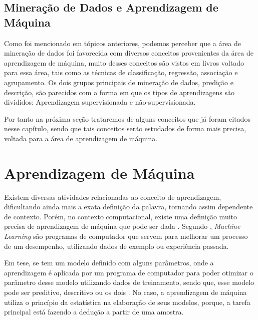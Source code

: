 \subsection{Mineração de Dados e Aprendizagem de Máquina}

\par
Como foi mencionado em tópicos anteriores, podemos perceber que a área de mineração de dados foi favorecida com diversos conceitos provenientes da área de aprendizagem de máquina, muito desses conceitos são vistos em livros voltado para essa área, tais como as técnicas de classificação, regressão, associação e agrupamento. Os dois grupos principais de mineração de dados, predição e descrição, são parecidos com a forma em que os tipos de aprendizagens são divididos: Aprendizagem supervisionada e não-supervisionada.

\par
Por tanto na próxima seção trataremos de alguns conceitos que já foram citados nesse capítulo, sendo que tais conceitos serão estudados de forma mais precisa, voltada para a área de aprendizagem de máquina.

\section{Aprendizagem de Máquina}

\par
Existem diversas atividades relacionadas ao conceito de aprendizagem, dificultando ainda mais a exata definição da palavra, tornando assim dependente de contexto. Porém, no contexto computacional, existe uma definição muito precisa de aprendizagem de máquina que pode ser dada \cite{Henke2011}. Segundo , \textit{Machine Learning} são programas de computador que servem para melhorar um processo de um desempenho, utilizando dados de exemplo ou experiência passada.

\par
Em tese, se tem um modelo definido com alguns parâmetros, onde a aprendizagem é aplicada por um programa de computador para poder otimizar o parâmetro desse modelo utilizando dados de treinamento, sendo que, esse modelo pode ser preditivo, descritivo ou os dois \cite{Alpaydin2009}. No caso, a aprendizagem de máquina utiliza o princípio da estatística na elaboração de seus modelos, porque, a tarefa principal está fazendo a dedução a partir de uma amostra. 

